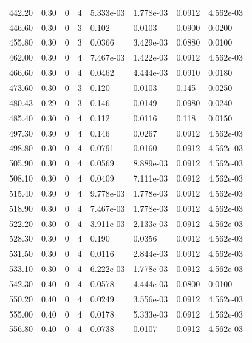 \documentclass[preview]{standalone}
\begin{document}
{{{{\begin{tabular}{L{1.2cm}C{1.2cm} C{0.3cm}C{0.5cm} C{1.4cm}C{1.4cm} C{1.4cm}C{1.4cm}}
  442.20  &  0.30  & 0     &  4 &  5.333e-03  & 1.778e-03  & 0.0912 &  4.562e-03   \\ 
  446.60  &  0.30  & 0     &  3 &  0.102  & 0.0103  & 0.0900 &  0.0200   \\ 
  455.80  &  0.30  & 0     &  3 &  0.0366  & 3.429e-03  & 0.0880 &  0.0100   \\ 
  462.00  &  0.30  & 0     &  4 &  7.467e-03  & 1.422e-03  & 0.0912 &  4.562e-03   \\ 
  466.60  &  0.30  & 0     &  4 &  0.0462  & 4.444e-03  & 0.0910 &  0.0180   \\ 
  473.60  &  0.30  & 0     &  3 &  0.120  & 0.0103  & 0.145 &  0.0250   \\ 
  480.43  &  0.29  & 0     &  3 &  0.146  & 0.0149  & 0.0980 &  0.0240   \\ 
  485.40  &  0.30  & 0     &  4 &  0.112  & 0.0116  & 0.118 &  0.0150   \\ 
  497.30  &  0.30  & 0     &  4 &  0.146  & 0.0267  & 0.0912 &  4.562e-03   \\ 
  498.80  &  0.30  & 0     &  4 &  0.0791  & 0.0160  & 0.0912 &  4.562e-03   \\ 
  505.90  &  0.30  & 0     &  4 &  0.0569  & 8.889e-03  & 0.0912 &  4.562e-03   \\ 
  508.10  &  0.30  & 0     &  4 &  0.0409  & 7.111e-03  & 0.0912 &  4.562e-03   \\ 
  515.40  &  0.30  & 0     &  4 &  9.778e-03  & 1.778e-03  & 0.0912 &  4.562e-03   \\ 
  518.90  &  0.30  & 0     &  4 &  7.467e-03  & 1.778e-03  & 0.0912 &  4.562e-03   \\ 
  522.20  &  0.30  & 0     &  4 &  3.911e-03  & 2.133e-03  & 0.0912 &  4.562e-03   \\ 
  528.30  &  0.30  & 0     &  4 &  0.190  & 0.0356  & 0.0912 &  4.562e-03   \\ 
  531.50  &  0.30  & 0     &  4 &  0.0116  & 2.844e-03  & 0.0912 &  4.562e-03   \\ 
  533.10  &  0.30  & 0     &  4 &  6.222e-03  & 1.778e-03  & 0.0912 &  4.562e-03   \\ 
  542.30  &  0.40  & 0     &  4 &  0.0578  & 4.444e-03  & 0.0800 &  0.0100   \\ 
  550.20  &  0.40  & 0     &  4 &  0.0249  & 3.556e-03  & 0.0912 &  4.562e-03   \\ 
  555.00  &  0.40  & 0     &  4 &  0.0178  & 5.333e-03  & 0.0912 &  4.562e-03   \\ 
  556.80  &  0.40  & 0     &  4 &  0.0738  & 0.0107  & 0.0912 &  4.562e-03   \\ 

\end{tabular}}}}}
\end{document}
